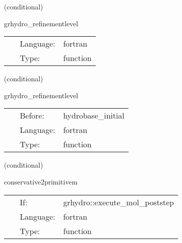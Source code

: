    (conditional) 

\hspace{5mm} grhydro\_refinementlevel 

\hspace{5mm}{\it calculate current refinement level } 


\hspace{5mm}

 \begin{tabular*}{160mm}{cll} 
~ & Language:  & fortran \\ 
~ & Type:  & function \\ 
\end{tabular*} 


\vspace{5mm}

   (conditional) 

\hspace{5mm} grhydro\_refinementlevel 

\hspace{5mm}{\it calculate current refinement level } 


\hspace{5mm}

 \begin{tabular*}{160mm}{cll} 
~ & Before:  & hydrobase\_initial \\ 
~ & Language:  & fortran \\ 
~ & Type:  & function \\ 
\end{tabular*} 


\vspace{5mm}

   (conditional) 

\hspace{5mm} conservative2primitivem 

\hspace{5mm}{\it convert back to primitive variables (general) - mhd version } 


\hspace{5mm}

 \begin{tabular*}{160mm}{cll} 
~ & If:  & grhydro::execute\_mol\_poststep \\ 
~ & Language:  & fortran \\ 
~ & Type:  & function \\ 
\end{tabular*} 


